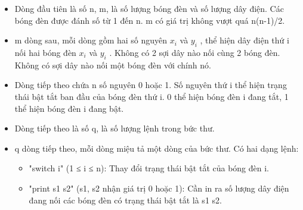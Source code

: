 \begin{itemize}
	\item Dòng đầu tiên là số n, m, là số lượng bóng đèn và số lượng dây điện. Các bóng đèn được đánh số từ 1 đến n. m có giá trị không vượt quá n(n-1)/2.
	\item m dòng sau, mỗi dòng gồm hai số nguyên $x_{i}$ và $y_{i}$ , thể hiện dây điện thứ i nối hai bóng đèn $x_{i}$ và $y_{i}$ . Không có 2 sợi dây nào nối cùng 2 bóng đèn. Không có sợi dây nào nối một bóng đèn với chính nó.
	\item Dòng tiếp theo chứa n số nguyên 0 hoặc 1. Số nguyên thứ i thể hiện trạng thái bật tắt ban đầu của bóng đèn thứ i. 0 thể hiện bóng đèn i đang tắt, 1 thể hiện bóng đèn i đang bật.
	\item Dòng tiếp theo là số q, là số lượng lệnh trong bức thư.
	\item q dòng tiếp theo, mỗi dòng miệu tả một dòng của bức thư. Có hai dạng lệnh:
\begin{itemize}
	\item "switch i" (1 ≤ i ≤ n): Thay đổi trạng thái bật tắt của bóng đèn i.
	\item "print s1 s2" (s1, s2 nhận giá trị 0 hoặc 1): Cần in ra số lượng dây điện đang nối các bóng đèn có trạng thái bật tắt là s1 s2.
\end{itemize}
\end{itemize}